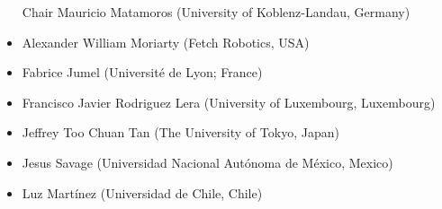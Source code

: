 \begin{itemize}
  \item[Chair] Mauricio Matamoros (University of Koblenz-Landau, Germany)
  \item Alexander William Moriarty (Fetch Robotics, USA)
  \item Fabrice Jumel (Université de Lyon; France)
  \item Francisco Javier Rodriguez Lera (University of Luxembourg, Luxembourg)
  \item Jeffrey Too Chuan Tan (The University of Tokyo, Japan)
  \item Jesus Savage (Universidad Nacional Autónoma de México, Mexico)
  \item Luz Martínez (Universidad de Chile, Chile)
\end{itemize}
